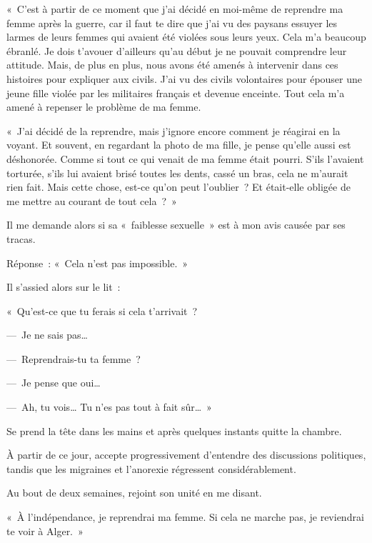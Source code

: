 \documentclass[french,twoside]{book} %
\begin{document}
« C’est à partir de ce moment que j’ai décidé en moi-même de reprendre ma femme après la guerre, car il faut te dire que j’ai vu des paysans essuyer les larmes de leurs femmes qui avaient été violées sous leurs yeux. Cela m’a beaucoup ébranlé. Je dois t’avouer d’ailleurs qu’au début je ne pouvait comprendre leur attitude. Mais, de plus en plus, nous avons été amenés à intervenir dans ces histoires pour expliquer aux civils. J’ai vu des civils volontaires pour épouser une jeune fille violée par les militaires français et devenue enceinte. Tout cela m’a amené à repenser le problème de ma femme.\par
 « J’ai décidé de la reprendre, mais j’ignore encore comment je réagirai en la voyant. Et souvent, en regardant la photo de ma fille, je pense qu’elle aussi est déshonorée. Comme si tout ce qui venait de ma femme était pourri. S’ils l’avaient torturée, s’ils lui avaient brisé toutes les dents, cassé un bras, cela ne m’aurait rien fait. Mais cette chose, est-ce qu’on peut l’oublier ? Et était-elle obligée de me mettre au courant de tout cela ? »\par
\bigbreak
\noindent Il me demande alors si sa « faiblesse sexuelle » est à mon avis causée par ses tracas.\par
Réponse : « Cela n’est pas impossible. »\par
Il s’assied alors sur le lit :\par
« Qu’est-ce que tu ferais si cela t’arrivait ?\par
— Je ne sais pas…\par
— Reprendrais-tu ta femme ?\par
— Je pense que oui…\par
— Ah, tu vois… Tu n’es pas tout à fait sûr… »\par
Se prend la tête dans les mains et après quelques instants quitte la chambre.\par
À partir de ce jour, accepte progressivement d’entendre des discussions politiques, tandis que les migraines et l’anorexie régressent considérablement.\par
Au bout de deux semaines, rejoint son unité en me disant.\par
« À l’indépendance, je reprendrai ma femme. Si cela ne marche pas, je reviendrai te voir à Alger. »
\end{document}
